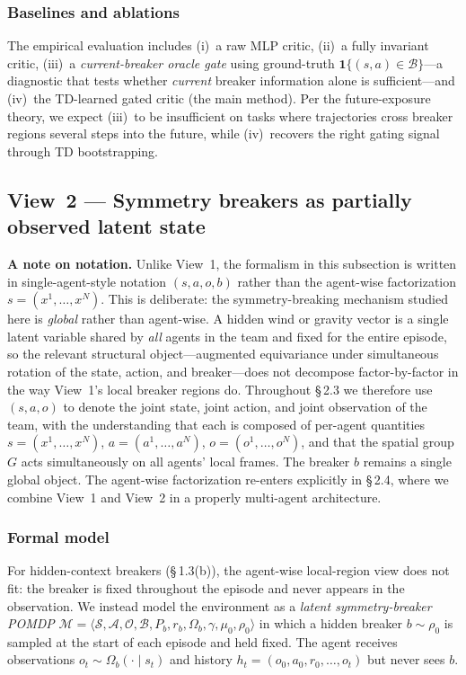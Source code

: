 \documentclass[11pt]{article}
\begin{document}
\subsubsection*{Baselines and ablations}

The empirical evaluation includes (i)~a raw MLP critic, (ii)~a fully invariant
critic, (iii)~a \textit{current-breaker oracle gate} using ground-truth
$\mathbf{1}\{(s,a) \in \mathcal{B}\}$---a diagnostic that tests whether
\textit{current} breaker information alone is sufficient---and (iv)~the TD-learned
gated critic (the main method). Per the future-exposure theory, we expect
(iii)~to be insufficient on tasks where trajectories cross breaker regions
several steps into the future, while (iv)~recovers the right gating signal
through TD bootstrapping.

\subsection*{View~2 --- Symmetry breakers as partially observed latent state}

\textbf{A note on notation.} Unlike View~1, the formalism in this subsection is
written in single-agent-style notation $(s, a, o, b)$ rather than the
agent-wise factorization $s = (x^1, \dots, x^N)$. This is deliberate: the
symmetry-breaking mechanism studied here is \textit{global} rather than agent-wise.
A hidden wind or gravity vector is a single latent variable shared by \textit{all}
agents in the team and fixed for the entire episode, so the relevant
structural object---augmented equivariance under simultaneous rotation of the
state, action, and breaker---does not decompose factor-by-factor in the way
View~1's local breaker regions do. Throughout \S\,2.3 we therefore use
$(s, a, o)$ to denote the joint state, joint action, and joint observation of
the team, with the understanding that each is composed of per-agent
quantities $s = (x^1, \dots, x^N)$, $a = (a^1, \dots, a^N)$,
$o = (o^1, \dots, o^N)$, and that the spatial group $G$ acts simultaneously on
all agents' local frames. The breaker $b$ remains a single global object. The
agent-wise factorization re-enters explicitly in \S\,2.4, where we combine
View~1 and View~2 in a properly multi-agent architecture.

\subsubsection*{Formal model}

For hidden-context breakers (\S\,1.3(b)), the agent-wise local-region view does
not fit: the breaker is fixed throughout the episode and never appears in the
observation. We instead model the environment as a \textit{latent symmetry-breaker
POMDP}
$\mathcal{M} = \langle \mathcal{S}, \mathcal{A}, \mathcal{O}, \mathcal{B}, P_b, r_b, \Omega_b, \gamma, \mu_0, \rho_0\rangle$
in which a hidden breaker $b \sim \rho_0$ is sampled at the start of each
episode and held fixed. The agent receives observations $o_t \sim \Omega_b(\cdot \mid s_t)$
and history $h_t = (o_0, a_0, r_0, \dots, o_t)$ but never sees $b$.
\end{document}
